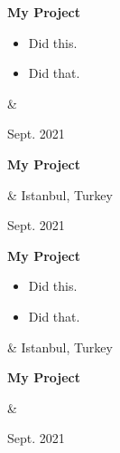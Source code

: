 \documentclass[10pt, letterpaper]{article}
\newenvironment{highlights}{
        \begin{itemize}[
                topsep=0pt,
                parsep=0.10 cm,
                partopsep=0pt,
                itemsep=0pt,
                after=\vspace{-1\baselineskip},
                leftmargin=0.4 cm + 3pt
            ]
    }{
        \end{itemize}
    } %
\let\originalTabularx\tabularx
\let\originalEndTabularx\endtabularx
\renewenvironment{tabularx}{\bgroup\centering\originalTabularx}{\originalEndTabularx\par\egroup}
\begin{document}
        \vspace{0.2 cm}
        \begin{tabularx}{
            \textwidth-0.4 cm-0.13cm
        }{
            K{0.2 cm}
            R{4.1 cm}
        }
            \textbf{My Project}

            \vspace{0.10 cm}

            \begin{highlights}
                \item Did this.
                \item Did that.
            \end{highlights}
            &
            

            Sept. 2021
        \end{tabularx}


        \vspace{0.2 cm}
        \begin{tabularx}{
            \textwidth-0.4 cm-0.13cm
        }{
            K{0.2 cm}
            R{4.1 cm}
        }
            \textbf{My Project}

            \vspace{0.10 cm}

            &
            Istanbul, Turkey

            Sept. 2021
        \end{tabularx}


        \vspace{0.2 cm}
        \begin{tabularx}{
            \textwidth-0.4 cm-0.13cm
        }{
            K{0.2 cm}
            R{4.1 cm}
        }
            \textbf{My Project}

            \vspace{0.10 cm}

            \begin{highlights}
                \item Did this.
                \item Did that.
            \end{highlights}
            &
            Istanbul, Turkey

            
        \end{tabularx}


        \vspace{0.2 cm}
        \begin{tabularx}{
            \textwidth-0.4 cm-0.13cm
        }{
            K{0.2 cm}
            R{4.1 cm}
        }
            \textbf{My Project}

            \vspace{0.10 cm}

            &
            

            Sept. 2021
        \end{tabularx}
\end{document}
